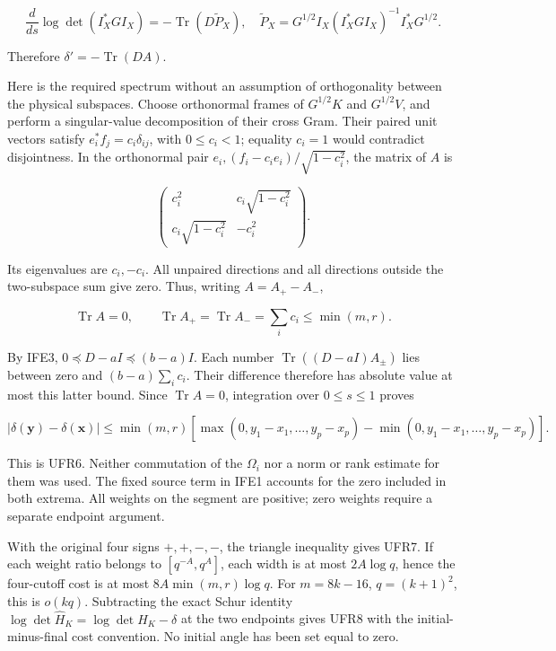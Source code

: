 \documentclass[11pt]{article}
\begin{document}
\[
\frac{d}{ds}\log\det(I_X^*GI_X)
=-\operatorname{Tr}(D\widetilde P_X),
\quad
\widetilde P_X=G^{1/2}I_X(I_X^*GI_X)^{-1}I_X^*G^{1/2}.
\tag{IFE4}
\]

Therefore \(\delta'=-\operatorname{Tr}(DA)\).

Here is the required spectrum without an assumption of orthogonality between the physical subspaces. Choose orthonormal frames of \(G^{1/2}K\) and \(G^{1/2}V\), and perform a singular-value decomposition of their cross Gram. Their paired unit vectors satisfy \(e_i^*f_j=c_i\delta_{ij}\), with \(0\le c_i<1\); equality \(c_i=1\) would contradict disjointness. In the orthonormal pair \(e_i,(f_i-c_ie_i)/\sqrt{1-c_i^2}\), the matrix of \(A\) is

\[
\begin{pmatrix}c_i^2&c_i\sqrt{1-c_i^2}\\
c_i\sqrt{1-c_i^2}&-c_i^2\end{pmatrix}.
\tag{IFE5}
\]

Its eigenvalues are \(c_i,-c_i\). All unpaired directions and all directions outside the two-subspace sum give zero. Thus, writing \(A=A_+-A_-\),

\[
\operatorname{Tr}A=0,
\qquad \operatorname{Tr}A_+=\operatorname{Tr}A_-=
\sum_i c_i\le\min(m,r).
\tag{IFE6}
\]

By IFE3, \(0\preceq D-aI\preceq(b-a)I\). Each number \(\operatorname{Tr}((D-aI)A_\pm)\) lies between zero and \((b-a)\sum_i c_i\). Their difference therefore has absolute value at most this latter bound. Since \(\operatorname{Tr}A=0\), integration over \(0\le s\le1\) proves

\[
\boxed{|\delta(\mathbf y)-\delta(\mathbf x)|
\le\min(m,r)
\left[\max(0,y_1-x_1,\ldots,y_p-x_p)
-\min(0,y_1-x_1,\ldots,y_p-x_p)\right].}
\tag{IFE7}
\]

This is UFR6. Neither commutation of the \(\Omega_i\) nor a norm or rank estimate for them was used. The fixed source term in IFE1 accounts for the zero included in both extrema. All weights on the segment are positive; zero weights require a separate endpoint argument.

With the original four signs \(+,+,-,-\), the triangle inequality gives UFR7. If each weight ratio belongs to \([q^{-A},q^A]\), each width is at most \(2A\log q\), hence the four-cutoff cost is at most \(8A\min(m,r)\log q\). For \(m=8k-16\), \(q=(k+1)^2\), this is \(o(kq)\). Subtracting the exact Schur identity \(\log\det\widehat H_K=\log\det H_K-\delta\) at the two endpoints gives UFR8 with the initial-minus-final cost convention. No initial angle has been set equal to zero.
\end{document}
